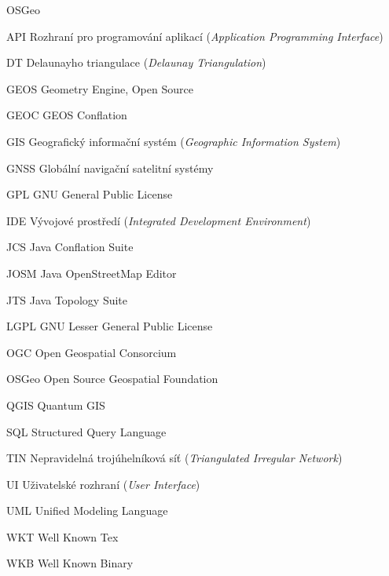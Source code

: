 

\begin{seznamzkratek}{OSGeo}

		{API}
		{Rozhraní pro programování aplikací (\textit{Application Programming Interface})}

		{DT}
		{Delaunayho triangulace  (\textit{Delaunay Triangulation})}

	      {GEOS}
	      {Geometry Engine, Open Source}

	      {GEOC}
	      {GEOS Conflation}

	      {GIS}
 	      {Geografický informační systém  (\textit{Geographic Information System})}
	
	      {GNSS}
	      {Globální navigační satelitní systémy}

	      {GPL}
	      {GNU General Public License}

	      {IDE}
 	      {Vývojové prostředí (\textit{Integrated Development Environment})}

	      {JCS}
 	      {Java Conflation Suite}

	      {JOSM}
	      {Java OpenStreetMap Editor}

	      {JTS}
	      {Java Topology Suite}

	      {LGPL}
	      {GNU Lesser General Public License}

	      {OGC}
	      {Open Geospatial Consorcium}

	      {OSGeo}
	      {Open Source Geospatial Foundation}

	      {QGIS}
 	      {Quantum GIS}

	      {SQL}
	      {Structured Query Language}

	      {TIN}
 	      {Nepravidelná trojúhelníková síť  (\textit{Triangulated Irregular Network})}

	      {UI}
	      {Uživatelské rozhraní (\textit{User Interface})}

	      {UML}
	      {Unified Modeling Language}

	      {WKT}
 	      {Well Known Tex}

	      {WKB}
 	      {Well Known Binary} %

\end{seznamzkratek}